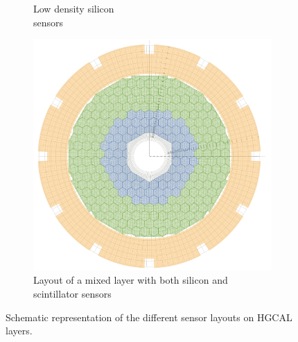 \begin{figure}[H]
\begin{subfigure}[t]{0.3\textwidth}
    \caption{Low density silicon \\ sensors}
    \end{subfigure}
     \begin{subfigure}[t]{0.3\textwidth}
     \includegraphics[width=\textwidth]{media/mixed_layer.png}
    \caption{Layout of a mixed layer with both silicon and scintillator sensors}
    \end{subfigure}
    \caption{Schematic representation of the different sensor layouts on HGCAL layers.}
    \label{fig:hgcal_sensors}
\end{figure}

